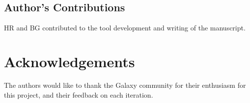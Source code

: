 \documentclass[a4paper,num-refs]{oup-contemporary}
\begin{document}
\subsection{Author's Contributions}
HR and BG contributed to the tool development and writing of the manuscript.

\section{Acknowledgements}
The authors would like to thank the Galaxy community for their enthusiasm for this project, and their feedback on each iteration.


\end{document}

